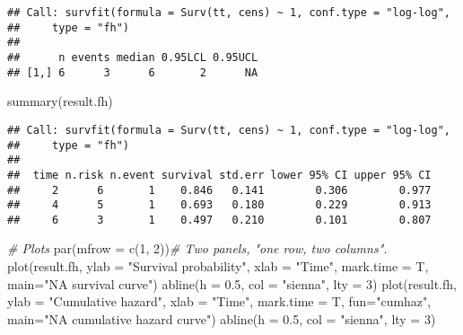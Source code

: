 \documentclass[
]{book}
\newenvironment{Shaded}{\begin{snugshade}}{\end{snugshade}}
\newcommand{\AttributeTok}[1]{\textcolor[rgb]{0.77,0.63,0.00}{#1}}
\newcommand{\CommentTok}[1]{\textcolor[rgb]{0.56,0.35,0.01}{\textit{#1}}}
\newcommand{\DecValTok}[1]{\textcolor[rgb]{0.00,0.00,0.81}{#1}}
\newcommand{\FloatTok}[1]{\textcolor[rgb]{0.00,0.00,0.81}{#1}}
\newcommand{\FunctionTok}[1]{\textcolor[rgb]{0.00,0.00,0.00}{#1}}
\newcommand{\NormalTok}[1]{#1}
\newcommand{\StringTok}[1]{\textcolor[rgb]{0.31,0.60,0.02}{#1}}
\begin{document}
\begin{verbatim}
## Call: survfit(formula = Surv(tt, cens) ~ 1, conf.type = "log-log", 
##     type = "fh")
## 
##      n events median 0.95LCL 0.95UCL
## [1,] 6      3      6       2      NA
\end{verbatim}

\begin{Shaded}
\begin{Highlighting}[]
\FunctionTok{summary}\NormalTok{(result.fh)}
\end{Highlighting}
\end{Shaded}

\begin{verbatim}
## Call: survfit(formula = Surv(tt, cens) ~ 1, conf.type = "log-log", 
##     type = "fh")
## 
##  time n.risk n.event survival std.err lower 95% CI upper 95% CI
##     2      6       1    0.846   0.141        0.306        0.977
##     4      5       1    0.693   0.180        0.229        0.913
##     6      3       1    0.497   0.210        0.101        0.807
\end{verbatim}

\begin{Shaded}
\begin{Highlighting}[]
\CommentTok{\# Plots}
\FunctionTok{par}\NormalTok{(}\AttributeTok{mfrow =} \FunctionTok{c}\NormalTok{(}\DecValTok{1}\NormalTok{, }\DecValTok{2}\NormalTok{))}\CommentTok{\# Two panels, "one row, two columns".}
\FunctionTok{plot}\NormalTok{(result.fh,}
     \AttributeTok{ylab =} \StringTok{"Survival probability"}\NormalTok{,}
     \AttributeTok{xlab =} \StringTok{"Time"}\NormalTok{,}
     \AttributeTok{mark.time =}\NormalTok{ T,}
     \AttributeTok{main=}\StringTok{"NA survival curve"}\NormalTok{)}
\FunctionTok{abline}\NormalTok{(}\AttributeTok{h =} \FloatTok{0.5}\NormalTok{, }\AttributeTok{col =} \StringTok{"sienna"}\NormalTok{, }\AttributeTok{lty =} \DecValTok{3}\NormalTok{)}
\FunctionTok{plot}\NormalTok{(result.fh,}
     \AttributeTok{ylab =} \StringTok{"Cumulative hazard"}\NormalTok{,}
     \AttributeTok{xlab =} \StringTok{"Time"}\NormalTok{,}
     \AttributeTok{mark.time =}\NormalTok{ T,}
     \AttributeTok{fun=}\StringTok{"cumhaz"}\NormalTok{,}
     \AttributeTok{main=}\StringTok{"NA cumulative hazard curve"}\NormalTok{)}
\FunctionTok{abline}\NormalTok{(}\AttributeTok{h =} \FloatTok{0.5}\NormalTok{, }\AttributeTok{col =} \StringTok{"sienna"}\NormalTok{, }\AttributeTok{lty =} \DecValTok{3}\NormalTok{)}
\end{Highlighting}
\end{Shaded}
\end{document}

